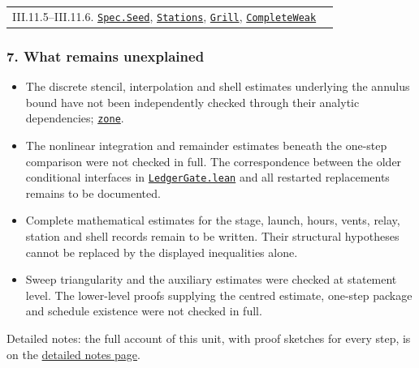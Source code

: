\documentclass[
  letterpaper,
  11pt]{article}
\providecommand{\tightlist}{%
  \setlength{\itemsep}{0pt}\setlength{\parskip}{0pt}}
\begin{document}
{\begin{longtable}[]{@{}
  >{\raggedright\arraybackslash}p{}
  >{\raggedright\arraybackslash}p{}@{}}
III.11.5--III.11.6.
\href{https://github.com/yang-mills-group/OpenAI-YM-20261028/blob/3456e5e75cf8d4cd558955a5c7638fba2d68f464/YM/Spec/Closed.lean\#L20-L26}{\texttt{Spec.Seed}},
\href{https://github.com/yang-mills-group/OpenAI-YM-20261028/blob/3456e5e75cf8d4cd558955a5c7638fba2d68f464/YM/Next/UV_STRESS/Station.lean\#L112-L114}{\texttt{Stations}},
\href{https://github.com/yang-mills-group/OpenAI-YM-20261028/blob/3456e5e75cf8d4cd558955a5c7638fba2d68f464/YM/Org/Input.lean\#L121-L123}{\texttt{Grill}},
\href{https://github.com/yang-mills-group/OpenAI-YM-20261028/blob/3456e5e75cf8d4cd558955a5c7638fba2d68f464/YM/MergeProof/East/Gran.lean\#L35}{\texttt{CompleteWeak}} \\
\end{longtable}
}

\subsubsection{7. What remains
unexplained}\label{what-remains-unexplained-13}

\begin{itemize}
\tightlist
\item
  The discrete stencil, interpolation and shell estimates underlying the
  annulus bound have not been independently checked through their
  analytic dependencies;
  \href{https://github.com/yang-mills-group/OpenAI-YM-20261028/blob/3456e5e75cf8d4cd558955a5c7638fba2d68f464/YM/MergeProof/West/Ozone.lean\#L21-L45}{\texttt{zone}}.
\item
  The nonlinear integration and remainder estimates beneath the one-step
  comparison were not checked in full. The correspondence between the
  older conditional interfaces in
  \href{https://github.com/yang-mills-group/OpenAI-YM-20261028/blob/3456e5e75cf8d4cd558955a5c7638fba2d68f464/YM/Next/RANK/LedgerGate.lean}{\texttt{LedgerGate.lean}}
  and all restarted replacements remains to be documented.
\item
  Complete mathematical estimates for the stage, launch, hours, vents,
  relay, station and shell records remain to be written. Their
  structural hypotheses cannot be replaced by the displayed inequalities
  alone.
\item
  Sweep triangularity and the auxiliary estimates were checked at
  statement level. The lower-level proofs supplying the centred
  estimate, one-step package and schedule existence were not checked in
  full.
\end{itemize}

Detailed notes: the full account of this unit, with proof sketches for
every step, is on the
\href{https://github.com/scottnarmstrong/yang-mills-informalization/blob/main/outline/notes/III-11.md}{detailed
notes page}.
\end{document}
